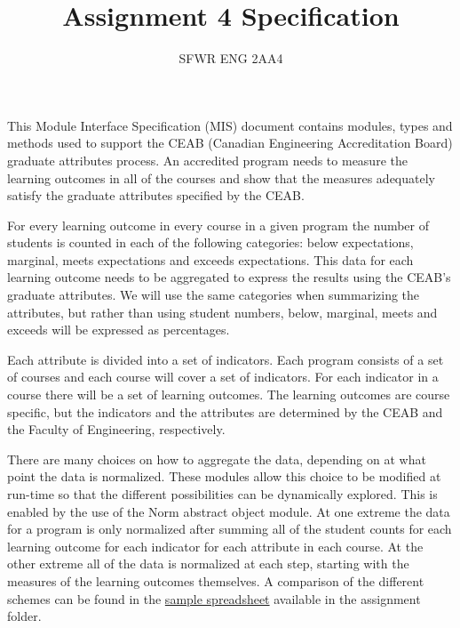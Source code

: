 \documentclass[12pt]{article}
\title{Assignment 4 Specification}
\author{SFWR ENG 2AA4}
\begin{document}
\maketitle
This Module Interface Specification (MIS) document contains modules, types and
methods used to support the CEAB (Canadian Engineering Accreditation Board)
graduate attributes process.  An accredited program needs to measure the
learning outcomes in all of the courses and show that the measures adequately
satisfy the graduate attributes specified by the CEAB.

For every learning outcome in every course in a given program the number of
students is counted in each of the following categories: below expectations,
marginal, meets expectations and exceeds expectations.  This data for each
learning outcome needs to be aggregated to express the results using the CEAB's
graduate attributes.  We will use the same categories when summarizing the
attributes, but rather than using student numbers, below, marginal, meets and
exceeds will be expressed as percentages.

Each attribute is divided into a set of indicators.  Each program consists of a
set of courses and each course will cover a set of indicators.  For each
indicator in a course there will be a set of learning outcomes.  The learning
outcomes are course specific, but the indicators and the attributes are
determined by the CEAB and the Faculty of Engineering, respectively.

There are many choices on how to aggregate the data, depending on at what point
the data is normalized.  These modules allow this choice to be modified at
run-time so that the different possibilities can be dynamically explored.  This
is enabled by the use of the Norm abstract object module.  At one extreme the
data for a program is only normalized after summing all of the student counts
for each learning outcome for each indicator for each attribute in each course.
At the other extreme all of the data is normalized at each step, starting with
the measures of the learning outcomes themselves.  A comparison of the different
schemes can be found in the
\href{https://gitlab.cas.mcmaster.ca/smiths/se2aa4_cs2me3/-/blob/master/Assignments/A3/AggregationStrategies.xlsx}
{sample spreadsheet} available in the assignment folder.


\end{document}
